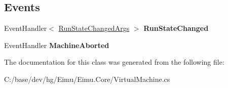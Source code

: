 \subsection*{Events}
\begin{DoxyCompactItemize}
\item 
\hypertarget{class_eimu_1_1_core_1_1_virtual_machine_aa281a1893e505124d2a12f0fc66cda5e}{
EventHandler$<$ \hyperlink{class_eimu_1_1_core_1_1_run_state_changed_args}{RunStateChangedArgs} $>$ {\bfseries RunStateChanged}}
\label{class_eimu_1_1_core_1_1_virtual_machine_aa281a1893e505124d2a12f0fc66cda5e}

\item 
\hypertarget{class_eimu_1_1_core_1_1_virtual_machine_aece34183693373f6f9a9f8f9fe6a7c24}{
EventHandler {\bfseries MachineAborted}}
\label{class_eimu_1_1_core_1_1_virtual_machine_aece34183693373f6f9a9f8f9fe6a7c24}

\end{DoxyCompactItemize}


The documentation for this class was generated from the following file:\begin{DoxyCompactItemize}
\item 
C:/base/dev/hg/Eimu/Eimu.Core/VirtualMachine.cs\end{DoxyCompactItemize}
